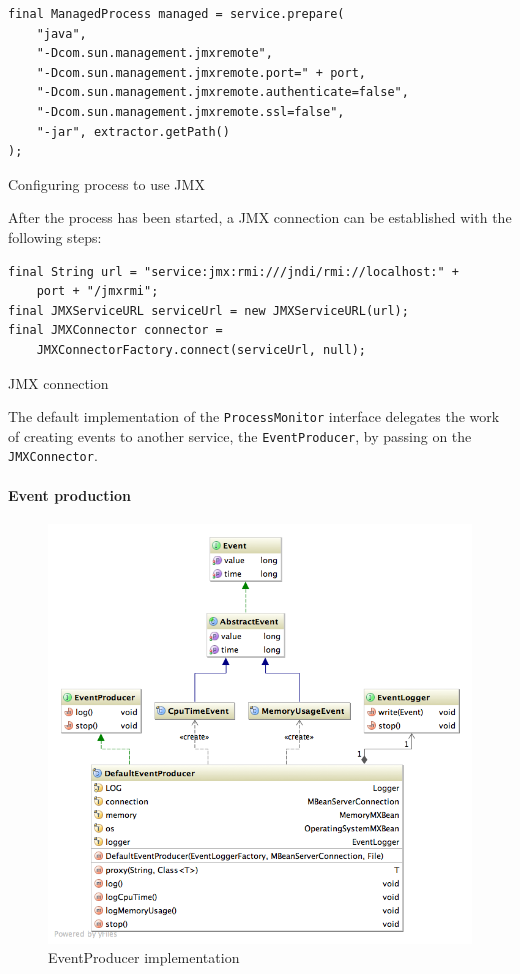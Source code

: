 \begin{listing}[H]
\begin{verbatim}
final ManagedProcess managed = service.prepare(
    "java",
    "-Dcom.sun.management.jmxremote",
    "-Dcom.sun.management.jmxremote.port=" + port,
    "-Dcom.sun.management.jmxremote.authenticate=false",
    "-Dcom.sun.management.jmxremote.ssl=false",
    "-jar", extractor.getPath()
);
\end{verbatim}
\caption{Configuring process to use JMX}
\label{lst:process-configuring}
\end{listing}

After the process has been started, a \gls{JMX} connection can be established with the following steps:

\begin{listing}[H]
\begin{verbatim}
final String url = "service:jmx:rmi:///jndi/rmi://localhost:" + 
    port + "/jmxrmi";
final JMXServiceURL serviceUrl = new JMXServiceURL(url);
final JMXConnector connector = 
    JMXConnectorFactory.connect(serviceUrl, null);
\end{verbatim}
\caption{JMX connection}
\label{lst:jmx}
\end{listing}

The default implementation of the \texttt{ProcessMonitor} interface delegates the work of creating events to another service, the \texttt{EventProducer}, by passing on the \texttt{JMXConnector}.

\newpage
\paragraph{Event production}
\begin{figure}[H]
\centering
\includegraphics[width=\textwidth]{event.png}
\caption{EventProducer implementation}
\end{figure}

